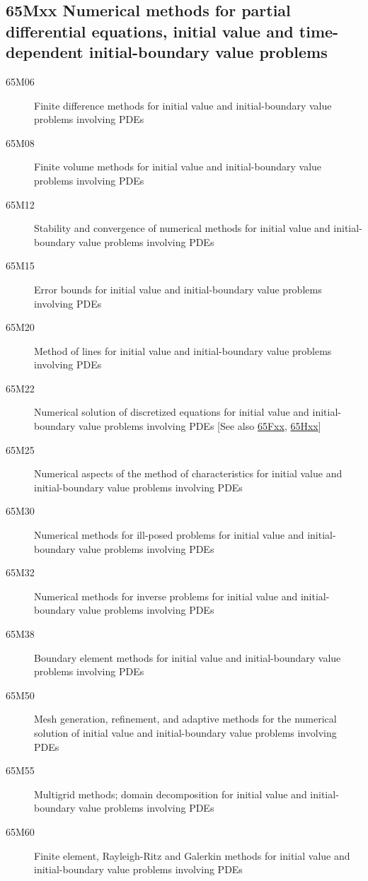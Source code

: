 \documentclass[letterpaper]{article}
\begin{document}
\subsection*{65Mxx Numerical methods for partial differential equations, initial value and time-dependent initial-boundary value problems }\label{65Mxx}
\begin{description}  
\item [65M06]\label{65M06} Finite difference methods for initial value and initial-boundary value problems involving PDEs
\item [65M08]\label{65M08} Finite volume methods for initial value and initial-boundary value problems involving PDEs
\item [65M12]\label{65M12} Stability and convergence of numerical methods for initial value and initial-boundary value problems involving PDEs
\item [65M15]\label{65M15} Error bounds for initial value and initial-boundary value problems involving PDEs
\item [65M20]\label{65M20} Method of lines for initial value and initial-boundary value problems involving PDEs
\item [65M22]\label{65M22} Numerical solution of discretized equations for initial value and initial-boundary value problems involving PDEs [See also \hyperref[65Fxx]{65Fxx}, \hyperref[65Hxx]{65Hxx}]
\item [65M25]\label{65M25} Numerical aspects of the method of characteristics for initial value and initial-boundary value problems involving PDEs
\item [65M30]\label{65M30} Numerical methods for ill-posed problems for initial value and initial-boundary value problems involving PDEs
\item [65M32]\label{65M32} Numerical methods for inverse problems for initial value and initial-boundary value problems involving PDEs
\item [65M38]\label{65M38} Boundary element methods for initial value and initial-boundary value problems involving PDEs
\item [65M50]\label{65M50} Mesh generation, refinement, and adaptive methods for the numerical solution of initial value and initial-boundary value problems involving PDEs
\item [65M55]\label{65M55} Multigrid methods; domain decomposition for initial value and initial-boundary value problems involving PDEs
\item [65M60]\label{65M60} Finite element, Rayleigh-Ritz and Galerkin methods for initial value and initial-boundary value problems involving PDEs

\end{description}
\end{document}
